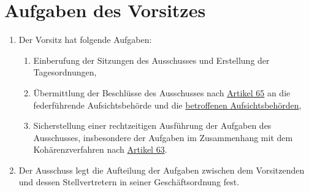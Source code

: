 \chapter{Aufgaben des Vorsitzes}
\label{ch:74}


\begin{enumerate}

  \item Der Vorsitz hat folgende Aufgaben:
  \label{itm:74-1}

  \begin{enumerate}
  
    \item Einberufung der Sitzungen des Ausschusses und Erstellung der Tagesordnungen,
    \label{itm:74-1a}

    \item Übermittlung der Beschlüsse des Ausschusses nach \hyperref[ch:65]{Artikel 65} an die federführende
     Aufsichtsbehörde und die \hyperref[itm:04-22]{betroffenen Aufsichtsbehörden},
    \label{itm:74-1b}

    \item Sicherstellung einer rechtzeitigen Ausführung der Aufgaben des Ausschusses, insbesondere der Aufgaben im
     Zusammenhang mit dem Kohärenzverfahren nach \hyperref[ch:63]{Artikel 63}.
    \label{itm:74-1c}

  \end{enumerate}

  \item Der Ausschuss legt die Aufteilung der Aufgaben zwischen dem Vorsitzenden und dessen Stellvertretern in seiner
   Geschäftsordnung fest.
  \label{itm:74-2}

\end{enumerate}


